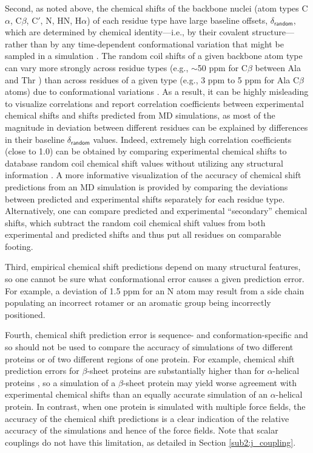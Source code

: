 \documentclass[9pt,review,pubversion]{livecoms}
\begin{document}
Second, as noted above, the chemical shifts of the backbone nuclei (atom types C$\alpha$, C$\beta$, C$'$, N, HN, H$\alpha$) of each residue type have large baseline offsets, $\delta_{\mathsf{random}}$, which are determined by chemical identity---i.e., by their covalent structure---rather than by any time-dependent conformational variation that might be sampled in a simulation \cite{schwarzinger_sequence-dependent_2001,de_simone_accurate_2009,tamiola_sequence-specific_2010,kjaergaard_sequence_2011}.
The random coil shifts of a given backbone atom type can vary more strongly across residue types (e.g., $\sim$50 ppm for C$\beta$ between Ala and Thr \cite{kjaergaard_disordered_2012}) than across residues of a given type (e.g., 3 ppm to 5 ppm for Ala C$\beta$ atoms) due to conformational variations \cite{ulrich_biomagresbank_2008,romero_biomagresbank_2020}.
As a result, it can be highly misleading to visualize correlations and report correlation coefficients between experimental chemical shifts and shifts predicted from MD simulations, as most of the magnitude in deviation between different residues can be explained by differences in their baseline $\delta_{\mathsf{random}}$ values.
Indeed, extremely high correlation coefficients (close to 1.0) can be obtained by comparing experimental chemical shifts to database random coil chemical shift values without utilizing any structural information \cite{de_simone_accurate_2009,kohlhoff_fast_2009,shen_sparta_2010,han_shiftx2_2011}.
A more informative visualization of the accuracy of chemical shift predictions from an MD simulation is provided by comparing the deviations between predicted and experimental shifts separately for each residue type.
Alternatively, one can compare predicted and experimental “secondary” chemical shifts, which subtract the random coil chemical shift values from both experimental and predicted shifts and thus put all residues on comparable footing.

Third, empirical chemical shift predictions depend on many structural features, so one cannot be sure what conformational error causes a given prediction error. For example, a deviation of 1.5 ppm for an N atom may result from a side chain populating an incorrect rotamer or an aromatic group being incorrectly positioned.

Fourth, chemical shift prediction error is sequence- and conformation-specific and so should not be used to compare the accuracy of simulations of two different proteins or of two different regions of one protein.
For example, chemical shift prediction errors for $\beta$-sheet proteins are substantially higher than for $\alpha$-helical proteins \cite{yang_predicting_2021}, so a simulation of a $\beta$-sheet protein may yield worse agreement with experimental chemical shifts than an equally accurate simulation of an $\alpha$-helical protein.
In contrast, when one protein is simulated with multiple force fields, the accuracy of the chemical shift predictions is a clear indication of the relative accuracy of the simulations and hence of the force fields.
Note that scalar couplings do not have this limitation, as detailed in Section \ref{sub2:j_coupling}.
\end{document}
